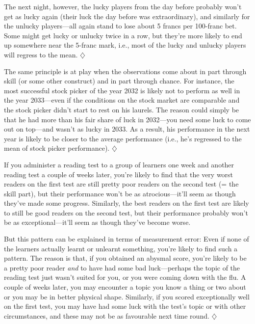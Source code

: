 \documentclass[a4paper]{tufte-book}\usepackage[]{graphicx}\usepackage[]{xcolor}
\newcommand*{\parend}[1][$\diamondsuit$]{%
  \unskip\nobreak\hspace{1em plus 1fill}$\diamondsuit$%
}
\begin{document}
The next night, however, the lucky players from the
day before probably won't get as lucky again (their luck the day before was
extraordinary), and similarly for the unlucky players---all again stand to
lose about 5 francs per 100-franc bet. Some might get lucky or unlucky twice in a
row, but they're more likely to end up somewhere near the 5-franc mark, i.e., most
of the lucky and unlucky players will regress to the mean.
\parend

The same principle is at play when the observations come about in part through
skill (or some other construct) and in part through chance.
For instance, the most successful stock picker of the year 2032 is likely
 not to perform as well in the year 2033---even if the conditions
 on the stock market are comparable and the stock picker didn't start to 
 rest on his laurels. The reason could simply be that he had more
 than his fair share of luck in 2032---you need some luck to 
 come out on top---and wasn't as lucky in 2033. As a result,
 his performance in the next year is likely to be closer to the
 average performance (i.e., he's regressed to the mean of stock
 picker performance).
\parend
 
If you administer a reading test to a group of learners
 one week and another reading test a couple of weeks later,
 you're likely to find that the very worst readers on the first test
 are still pretty poor readers on the second test (= the skill part),
 but their performance won't be as atrocious---it'll seem as though
 they've made some progress. Similarly, the best readers on the first
 test are likely to still be good readers on the second test, but
 their performance probably won't be as exceptional---it'll seem as
 though they've become worse.
 
 But this pattern can be explained in
 terms of measurement error: Even if none of the learners actually
 learnt or unlearnt something, you're likely to find such a pattern.
 The reason is that, if you obtained an abysmal score, you're likely
 to be a pretty poor reader \emph{and} to have had some bad luck---perhaps
 the topic of the reading test just wasn't suited for you, or you
 were coming down with the flu. A couple of weeks later, you may
 encounter a topic you know a thing or two about or you may
 be in better physical shape.
 Similarly, if you scored exceptionally well on the first test,
 you may have had some luck with the test's topic or with other
 circumstances, and these may not be as favourable next time round.
\parend
\end{document}
